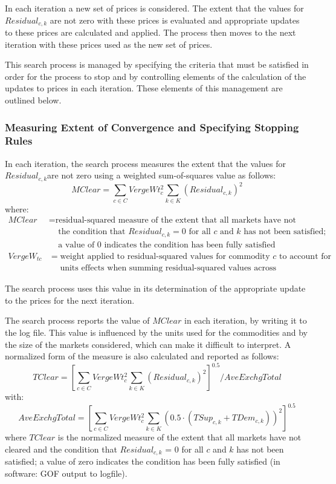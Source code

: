 In each iteration a new set of prices is considered. The extent that the values for $Residual_{c,k}$ are not zero with these prices is evaluated and appropriate updates to these prices are calculated and applied. The process then moves to the next iteration with these prices used as the new set of prices.

This search process is managed by specifying the criteria that must be satisfied in order for the process to stop and by controlling elements of the calculation of the updates to prices in each iteration. These elements of this management are outlined below.

\subsubsection{Measuring Extent of Convergence and Specifying Stopping Rules}
In each iteration, the search process measures the extent that the values for $Residual_{c,k}$are not zero using a weighted sum-of-squares value as follows:
\begin{equation}\label{eq:6.35}
MClear = \sum_{c \in C} VergeWt_c^2 \sum_{k \in K} (Residual_{c,k})^2
\end{equation}
\noindent where:
\begin{align*}
MClear &= \text{residual-squared measure of the extent that all markets have not cleared and} \\
 &~~~~~\text{the condition that $Residual_{c,k} = 0$ for all $c$ and $k$ has not been satisfied;} \\
 &~~~~~\text{a value of 0 indicates the condition has been fully satisfied} \\
VergeW_{tc} &= \text{weight applied to residual-squared values for commodity $c$ to account for} \\
 &~~~~~~\text{units effects when summing residual-squared values across commodities} 
\end{align*}

The search process uses this value in its determination of the appropriate update to the prices for the next iteration.

The search process reports the value of $MClear$ in each iteration, by writing it to the log file. This value is influenced by the units used for the commodities and by the size of the markets considered, which can make it difficult to interpret.  A normalized form of the measure is also calculated and reported as follows:
\begin{equation}\label{eq:6.36}
TClear = \left[ \sum_{c \in C} VergeWt_c^2 \sum_{k \in K} (Residual_{c,k})^2 \right]^{0.5} /  AveExchgTotal
\end{equation}
\noindent with:
\begin{equation}\label{eq:6.37}
AveExchgTotal = \left[ \sum_{c \in C} VergeWt_c^2 \sum_{k \in K} (0.5 \cdot (TSup_{c,k} +TDem_{c,k}))^2 \right]^{0.5}
\end{equation}
\noindent where $TClear$ is the normalized measure of the extent that all markets have not cleared and the condition that $Residual_{c,k}$ = 0 for all $c$ and $k$ has not been satisfied; a value of zero indicates the condition has been fully satisfied (in software: GOF output to logfile).


